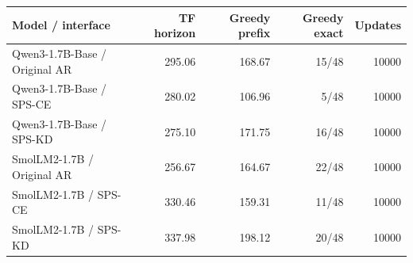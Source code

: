 \begin{tabular}{lrrrr}
\toprule
Model / interface & TF horizon & Greedy prefix & Greedy exact & Updates \\
\midrule
Qwen3-1.7B-Base / Original AR & 295.06 & 168.67 & 15/48 & 10000 \\
Qwen3-1.7B-Base / SPS-CE & 280.02 & 106.96 & 5/48 & 10000 \\
Qwen3-1.7B-Base / SPS-KD & 275.10 & 171.75 & 16/48 & 10000 \\
SmolLM2-1.7B / Original AR & 256.67 & 164.67 & 22/48 & 10000 \\
SmolLM2-1.7B / SPS-CE & 330.46 & 159.31 & 11/48 & 10000 \\
SmolLM2-1.7B / SPS-KD & 337.98 & 198.12 & 20/48 & 10000 \\
\bottomrule
\end{tabular}
